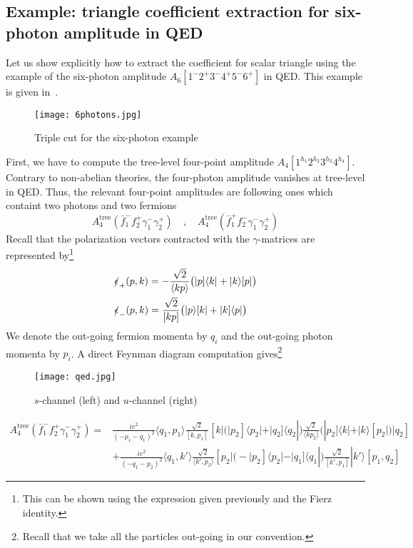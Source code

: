 \subsection{Example: triangle coefficient extraction for six-photon amplitude in QED}
Let us show explicitly how to extract the coefficient for scalar triangle using the example of the six-photon amplitude $A_6[1^-2^+3^-4^+5^-6^+]$ in QED.
This example is given in~\cite{Forde:2007mi}.
\begin{figure}
  \centering
  \texttt{[image: 6photons.jpg]}
  \caption{Triple cut for the six-photon example}
  \label{fig-6photons}
\end{figure}
First, we have to compute the tree-level four-point amplitude $A_4[1^{h_1}2^{h_2}3^{h_3}4^{h_4}]$. 
Contrary to non-abelian theories, the four-photon amplitude vanishes at tree-level in QED.
Thus, the relevant four-point amplitudes are following ones which containt two photons and two fermions
\begin{equation}
A_4^{\mathrm{tree}}(\bar{f}_1^- f_2^+ \gamma_1^-\gamma_2^+)
\quad,\quad
A_4^{\mathrm{tree}}(\bar{f}_1^+ f_2^- \gamma_1^-\gamma_2^+)
\end{equation}
Recall that the polarization vectors contracted with the $\gamma$-matrices are represented by\footnote{This can be shown using the expression given previously and the Fierz identity.}
\begin{equation}
\begin{split}
& \slashed{\epsilon}_+(p,k) = -\frac{\sqrt{2}}{\langle kp\rangle}\big(|p]\langle k| + |k\rangle[p|\big)
\\
& \slashed{\epsilon}_-(p,k) = \frac{\sqrt{2}}{[kp]}\big(|p\rangle [k| + |k]\langle p|\big)
\end{split}
\end{equation}
We denote the out-going fermion momenta by $q_i$ and the out-going photon momenta by $p_i$. 
A direct Feynman diagram computation gives\footnote{Recall that we take all the particles out-going in our convention.}
\begin{figure}[h]
  \centering
  \texttt{[image: qed.jpg]}
  \caption{$s$-channel (left) and $u$-channel (right)}
  \label{fig-qed}
\end{figure}
%
\begin{equation}
\begin{split}
A_{4}^{\mathrm{tree}}(\bar{f}_1^- f_2^+ \gamma_1^-\gamma_2^+) 
= &
\frac{ie^2}{(-p_1 - q_1)^2}\langle q_1, p_1\rangle \frac{\sqrt{2}}{[k, p_1]}
[k|\big(|p_2] \langle p_2| + |q_2]\langle q_2|\big)
\frac{\sqrt{2}}{\langle k p_2\rangle}
\big(|p_2]\langle k| + |k\rangle[p_2|\big) |q_2]
\\
&
+\frac{ie^2}{(-q_1-p_2)^2}\langle q_1, k'\rangle
\frac{\sqrt{2}}{\langle k', p_2\rangle}[p_2|
\big( -|p_2]\langle p_2| - |q_1]\langle q_1|\big)
\frac{\sqrt{2}}{[k', p_1]}|k'\rangle [p_1, q_2]
\end{split}
\end{equation}

